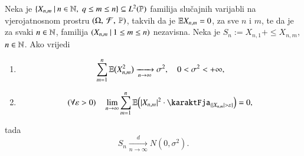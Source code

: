 \begin{tm}  \label{tm:19.4}
    Neka je $\{{X_{n, m}} \: | \: {n \in \mathbb{N}, \; q \leq m \leq n}\} \subseteq L^2 (\mathbb{P})$ familija slu\v cajnih varijabli na vjerojatnosnom prostru $(\Omega, \: \mathcal{F}, \: \mathbb{P})$, takvih da je $\mathbb{E} X_{n, m} = 0$, za sve $n$ i $m$, te da je za svaki $n \in \mathbb{N}$, familija $({X_{n, m}} \: | \: { 1 \leq m \leq n})$ nezavisna.
    Neka je $S_n := X_{n, 1} + \leq X_{n, m}$, $n \in \mathbb{N}$.
    Ako vrijedi
    \begin{enumerate}[label=(\alph*)]
        \item \label{tm:19.4.1}
        \begin{equation*}
            \sum\limits_{m = 1}^{n} \mathbb{E} \big( X_{n, m}^2 \big) \xrightarrow[n \to \infty]{} \sigma^2, \quad 0 < \sigma^2 < +\infty,
        \end{equation*}
        \item \label{tm:19.4.2}
        \begin{equation*}
            (\forall \varepsilon > 0) \quad \lim\limits_{n \to \infty} \suma{m = 1}{n} \masE \Big( |X_{n, m}|^2 \cdot \karaktFja_{\{ |X_{n, m}| > \varepsilon \}} \Big) = 0,
        \end{equation*}
    \end{enumerate}
    tada
    \begin{equation*}
        S_n \xrightarrow[n \to \infty]{d}  N (0, \sigma^2).
    \end{equation*}
\end{tm}

